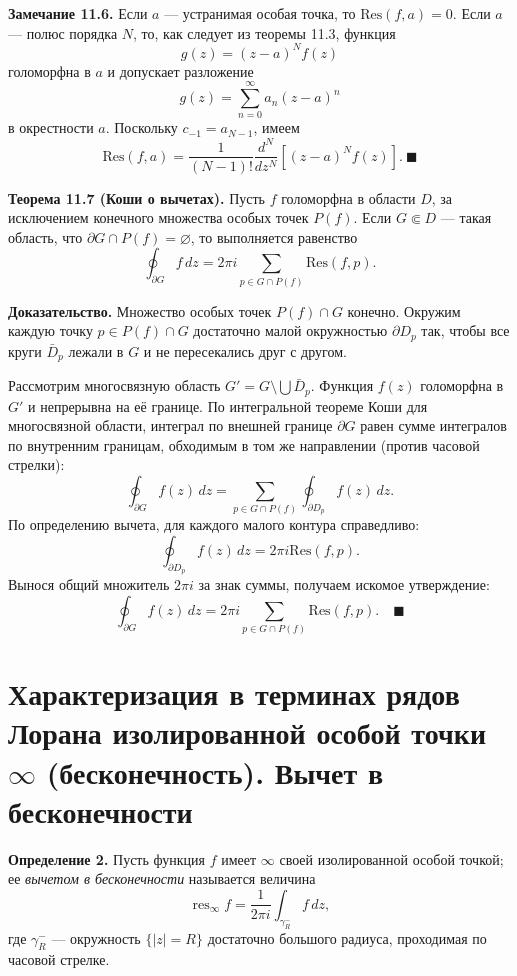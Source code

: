 \documentclass[12pt, a4paper]{article}
\theoremstyle{definition}
\theoremstyle{remark}
\begin{document}
\textbf{Замечание 11.6.} Если $a$ --- устранимая особая точка, то $\text{Res}(f, a) = 0$. Если $a$ --- полюс порядка $N$, то, как следует из теоремы 11.3, функция
$$g(z) = (z - a)^N f(z)$$
голоморфна в $a$ и допускает разложение
$$g(z) = \sum_{n=0}^{\infty} a_n (z - a)^n$$
в окрестности $a$. Поскольку $c_{-1} = a_{N-1}$, имеем
$$\text{Res}(f, a) = \frac{1}{(N - 1)!} \frac{d^N}{dz^N} [(z - a)^N f(z)]. \ \blacksquare$$

\textbf{Теорема 11.7 (Коши о вычетах).} Пусть $f$ голоморфна в области $D$, за исключением конечного множества особых точек $P(f)$. Если $G \Subset D$ --- такая область, что $\partial G \cap P(f) = \varnothing$, то выполняется равенство
\begin{equation}
	\oint_{\partial G} f \, dz = 2\pi i \sum_{p \in G \cap P(f)} \text{Res}(f, p).
\end{equation}

\textbf{Доказательство.} Множество особых точек $P(f) \cap G$ конечно. Окружим каждую точку $p \in P(f) \cap G$ достаточно малой окружностью $\partial D_p$ так, чтобы все круги $\bar{D}_p$ лежали в $G$ и не пересекались друг с другом. 

Рассмотрим многосвязную область $G' = G \setminus \bigcup \bar{D}_p$. Функция $f(z)$ голоморфна в $G'$ и непрерывна на её границе. По интегральной теореме Коши для многосвязной области, интеграл по внешней границе $\partial G$ равен сумме интегралов по внутренним границам, обходимым в том же направлении (против часовой стрелки):
$$
\oint_{\partial G} f(z) \, dz = \sum_{p \in G \cap P(f)} \oint_{\partial D_p} f(z) \, dz.
$$
По определению вычета, для каждого малого контура справедливо:
$$
\oint_{\partial D_p} f(z) \, dz = 2\pi i \text{Res}(f, p).
$$
Вынося общий множитель $2\pi i$ за знак суммы, получаем искомое утверждение:
$$
\oint_{\partial G} f(z) \, dz = 2\pi i \sum_{p \in G \cap P(f)} \text{Res}(f, p). \quad \blacksquare
$$

\newpage
\section{Характеризация в терминах рядов Лорана изолированной особой точки $\infty$ (бесконечность). Вычет в бесконечности}

\textbf{Определение 2.} Пусть функция $f$ имеет $\infty$ своей изолированной особой точкой; ее \textit{вычетом в бесконечности} называется величина
\begin{equation}
	\mathop{\text{res}}_{\infty} f = \frac{1}{2\pi i} \int_{\gamma_R^-} f \, dz,
\end{equation}
где $\gamma_R^-$ --- окружность $\{|z| = R\}$ достаточно большого радиуса, проходимая по часовой стрелке.
\end{document}

